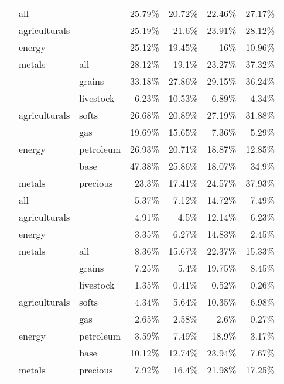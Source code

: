\documentclass[]{elsarticle} %
\begin{document}
\begin{longtable}[t]{>{}lllrrrr}
\endfoot
\bottomrule
\endlastfoot
 & all &  & 25.79\% & 20.72\% & 22.46\% & 27.17\%\\
\nopagebreak
 & agriculturals &  & 25.19\% & 21.6\% & 23.91\% & 28.12\%\\
\nopagebreak
 & energy &  & 25.12\% & 19.45\% & 16\% & 10.96\%\\
\nopagebreak
 & metals & \multirow[t]{-4}{*}{\raggedright\arraybackslash all} & 28.12\% & 19.1\% & 23.27\% & 37.32\%\\
\nopagebreak
 &  & grains & 33.18\% & 27.86\% & 29.15\% & 36.24\%\\
\nopagebreak
 &  & livestock & 6.23\% & 10.53\% & 6.89\% & 4.34\%\\
\nopagebreak
 & \multirow[t]{-3}{*}{\raggedright\arraybackslash agriculturals} & softs & 26.68\% & 20.89\% & 27.19\% & 31.88\%\\
\nopagebreak
 &  & gas & 19.69\% & 15.65\% & 7.36\% & 5.29\%\\
\nopagebreak
 & \multirow[t]{-2}{*}{\raggedright\arraybackslash energy} & petroleum & 26.93\% & 20.71\% & 18.87\% & 12.85\%\\
\nopagebreak
 &  & base & 47.38\% & 25.86\% & 18.07\% & 34.9\%\\
\nopagebreak
\multirow[t]{-11}{*}{\raggedright\arraybackslash \textbf{individual CHP}} & \multirow[t]{-2}{*}{\raggedright\arraybackslash metals} & precious & 23.3\% & 17.41\% & 24.57\% & 37.93\%\\
\cmidrule{1-7}\pagebreak[0]
 & all &  & 5.37\% & 7.12\% & 14.72\% & 7.49\%\\
\nopagebreak
 & agriculturals &  & 4.91\% & 4.5\% & 12.14\% & 6.23\%\\
\nopagebreak
 & energy &  & 3.35\% & 6.27\% & 14.83\% & 2.45\%\\
\nopagebreak
 & metals & \multirow[t]{-4}{*}{\raggedright\arraybackslash all} & 8.36\% & 15.67\% & 22.37\% & 15.33\%\\
\nopagebreak
 &  & grains & 7.25\% & 5.4\% & 19.75\% & 8.45\%\\
\nopagebreak
 &  & livestock & 1.35\% & 0.41\% & 0.52\% & 0.26\%\\
\nopagebreak
 & \multirow[t]{-3}{*}{\raggedright\arraybackslash agriculturals} & softs & 4.34\% & 5.64\% & 10.35\% & 6.98\%\\
\nopagebreak
 &  & gas & 2.65\% & 2.58\% & 2.6\% & 0.27\%\\
\nopagebreak
 & \multirow[t]{-2}{*}{\raggedright\arraybackslash energy} & petroleum & 3.59\% & 7.49\% & 18.9\% & 3.17\%\\
\nopagebreak
 &  & base & 10.12\% & 12.74\% & 23.94\% & 7.67\%\\
\nopagebreak
\multirow[t]{-11}{*}{\raggedright\arraybackslash \textbf{aggregate CHP}} & \multirow[t]{-2}{*}{\raggedright\arraybackslash metals} & precious & 7.92\% & 16.4\% & 21.98\% & 17.25\%\\*
\end{longtable}
\endgroup{}
\end{document}
